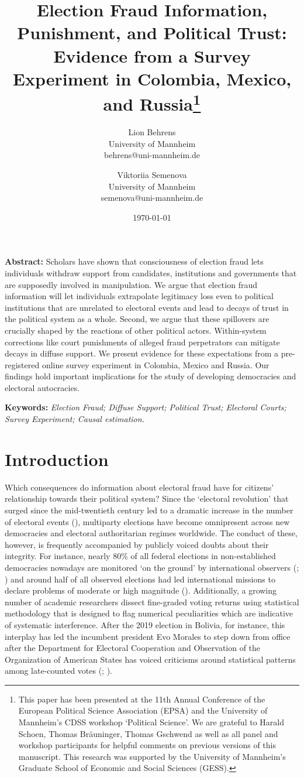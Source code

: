 \documentclass[11pt, ngerman,english,a4]{article}
\author{
	Lion Behrens\\University of Mannheim\\behrens@uni-mannheim.de\\
	\and
	Viktoriia Semenova\\University of Mannheim\\semenova@uni-mannheim.de
}
\date{\today }
\title{Election Fraud Information, Punishment, and Political Trust: Evidence from a Survey Experiment in Colombia, Mexico, and Russia\footnote{This paper has been presented at the 11th Annual Conference of the European Political Science Association (EPSA) and the University of Mannheim's CDSS workshop `Political Science'. We are grateful to Harald Schoen, Thomas Bräuninger, Thomas Gschwend as well as all panel and workshop participants for helpful comments on previous versions of this manuscript. This research was supported by the University of Mannheim's Graduate School of Economic and Social Sciences (GESS).}\vspace{0.7cm}}
\begin{document}
\maketitle
\thispagestyle{empty}

\onehalfspacing


\noindent \textbf{Abstract:} Scholars have shown that consciousness of election fraud lets individuals withdraw support from candidates, institutions and governments that are supposedly involved in manipulation. We argue that election fraud information will let individuals extrapolate legitimacy loss even to political institutions that are unrelated to electoral events and lead to decays of trust in the political system as a whole. Second, we argue that these spillovers are crucially shaped by the reactions of other political actors. Within-system corrections like court punishments of alleged fraud perpetrators can mitigate decays in diffuse support. We present evidence for these expectations from a pre-registered online survey experiment in Colombia, Mexico and Russia. Our findings hold important implications for the study of developing democracies and electoral autocracies.


\vspace{1cm}

\noindent \textbf{Keywords:} \textit{Election Fraud; Diffuse Support; Political Trust; Electoral Courts; Survey Experiment; Causal estimation.} \\ 



\newpage
\setcounter{page}{1}
\doublespacing

\section*{Introduction}

Which consequences do information about electoral fraud have for citizens' relationship towards their political system? Since the `electoral revolution' that surged since the mid-twentieth century led to a dramatic increase in the number of electoral events (\citealt{Norris2014}), multiparty elections have become omnipresent across new democracies and electoral authoritarian regimes worldwide. The conduct of these, however, is frequently accompanied by publicly voiced doubts about their integrity. For instance, nearly 80\% of all federal elections in non-established democracies nowadays are monitored `on the ground' by international observers (\citealt{Kelley2012a}; \citealt{Hyde2011}) and around half of all observed elections had led international missions to declare problems of moderate or high magnitude (\citealt{Kelley2012a, Kelley2012b}). Additionally, a growing number of academic researchers dissect fine-graded voting returns using statistical methodology that is designed to flag numerical peculiarities which are indicative of systematic interference. After the 2019 election in Bolivia, for instance, this interplay has led the incumbent president Evo Morales to step down from office after the Department for Electoral Cooperation and Observation of the Organization of American States has voiced criticisms around statistical patterns among late-counted votes (\citealt{OAS2019}; \citealt{Idrobo2020}).
\end{document}
